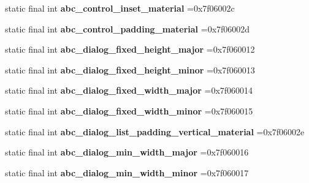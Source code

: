 \begin{DoxyCompactItemize}
static final int {\bfseries abc\+\_\+control\+\_\+inset\+\_\+material} =0x7f06002c
\item 
\mbox{\label{classproject4_1_1xaria_1_1R_1_1dimen_afc942e1d5f5eae6a51240f6a31924d09}} 
static final int {\bfseries abc\+\_\+control\+\_\+padding\+\_\+material} =0x7f06002d
\item 
\mbox{\label{classproject4_1_1xaria_1_1R_1_1dimen_a0b3bedaa5799a470cf224068fa835d26}} 
static final int {\bfseries abc\+\_\+dialog\+\_\+fixed\+\_\+height\+\_\+major} =0x7f060012
\item 
\mbox{\label{classproject4_1_1xaria_1_1R_1_1dimen_a038df91028a8d18d1c06b6ee70a7f806}} 
static final int {\bfseries abc\+\_\+dialog\+\_\+fixed\+\_\+height\+\_\+minor} =0x7f060013
\item 
\mbox{\label{classproject4_1_1xaria_1_1R_1_1dimen_a4c369df337720be3458dd296b8f13b07}} 
static final int {\bfseries abc\+\_\+dialog\+\_\+fixed\+\_\+width\+\_\+major} =0x7f060014
\item 
\mbox{\label{classproject4_1_1xaria_1_1R_1_1dimen_acfd6fa99788123a49ea859d0cced6b9e}} 
static final int {\bfseries abc\+\_\+dialog\+\_\+fixed\+\_\+width\+\_\+minor} =0x7f060015
\item 
\mbox{\label{classproject4_1_1xaria_1_1R_1_1dimen_ae947652e42d986cb5a4f7c0dfd77454d}} 
static final int {\bfseries abc\+\_\+dialog\+\_\+list\+\_\+padding\+\_\+vertical\+\_\+material} =0x7f06002e
\item 
\mbox{\label{classproject4_1_1xaria_1_1R_1_1dimen_af35d7633914533765063d4bcb731b22e}} 
static final int {\bfseries abc\+\_\+dialog\+\_\+min\+\_\+width\+\_\+major} =0x7f060016
\item 
\mbox{\label{classproject4_1_1xaria_1_1R_1_1dimen_af0cbba774bc6d226c2a27aad6575d5dc}} 
static final int {\bfseries abc\+\_\+dialog\+\_\+min\+\_\+width\+\_\+minor} =0x7f060017
\item 

\end{DoxyCompactItemize}
